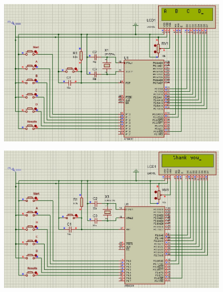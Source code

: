 \begin{figure}[H]  %
\begin{center}
\includegraphics[scale=0.50]{Chapter4/simulation5}
\end{center}
\end{figure}
\begin{figure}[H]  %
\begin{center}
\includegraphics[scale=0.50]{Chapter4/simulation6}
\end{center}
\end{figure}
